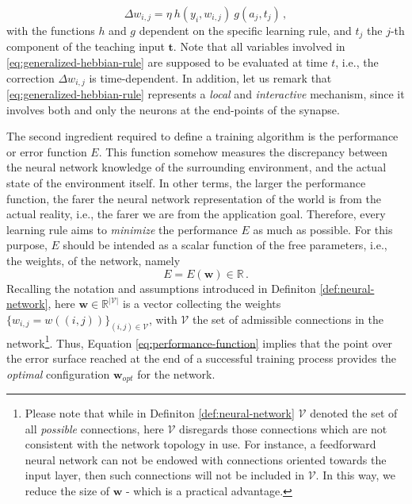 \documentclass[12pt, a4paper, twoside, openright]{report}
\numberwithin{equation}{chapter}
\theoremstyle{theorem}
\theoremstyle{definition}
\theoremstyle{remark}
\theoremstyle{proposition}
\numberwithin{figure}{chapter}
\begin{document}
		\begin{equation}
			\label{eq:generalized-hebbian-rule}
			\Delta w_{i,j} = \eta ~ h(y_i,w_{i,j}) ~ g(a_j,t_j) \, ,
		\end{equation}
		with the functions $h$ and $g$ dependent on the specific learning rule, and $t_j$ the $j$-th component of the teaching input $\mathbf{t}$. Note that all variables involved in \eqref{eq:generalized-hebbian-rule} are supposed to be evaluated at time $t$, i.e., the correction $\Delta w_{i,j}$ is time-dependent. In addition, let us remark that \eqref{eq:generalized-hebbian-rule} represents a \emph{local} and \emph{interactive} mechanism, since it involves both and only the neurons at the end-points of the synapse.
		
		The second ingredient required to define a training algorithm is the performance or error function $E$. This function somehow measures the discrepancy between the neural network knowledge of the surrounding environment, and the actual state of the environment itself. In other terms, the larger the performance function, the farer the neural network representation of the world is from the actual reality, i.e., the farer we are from the application goal. Therefore, every learning rule aims to \emph{minimize} the performance $E$ as much as possible. For this purpose, $E$ should be intended as a scalar function of the free parameters, i.e., the weights, of the network, namely 
		\begin{equation}
			\label{eq:performance-function}
			E = E(\mathbf{w}) \in \mathbb{R} \, . 
		\end{equation}
		Recalling the notation and assumptions introduced in Definiton \ref{def:neural-network}, here $\mathbf{w} \in \mathbb{R}^{|\mathcal{V}|}$ is a vector collecting the weights $\big\lbrace w_{i,j} = w((i,j)) \big\rbrace_{(i,j) \in \mathcal{V}}$, with $\mathcal{V}$ the set of admissible connections in the network\footnote{Please note that while in Definiton \ref{def:neural-network} $\mathcal{V}$ denoted the set of all \emph{possible} connections, here $\mathcal{V}$ disregards those connections which are not consistent with the network topology in use. For instance, a feedforward neural network can not be endowed with connections oriented towards the input layer, then such connections will not be included in $\mathcal{V}$. In this way, we reduce the size of $\mathbf{w}$ - which is a practical advantage.}. Thus, Equation \eqref{eq:performance-function} implies that the point over the error surface reached at the end of a successful training process provides the \emph{optimal} configuration $\mathbf{w}_{opt}$ for the network.
		
\end{document}
